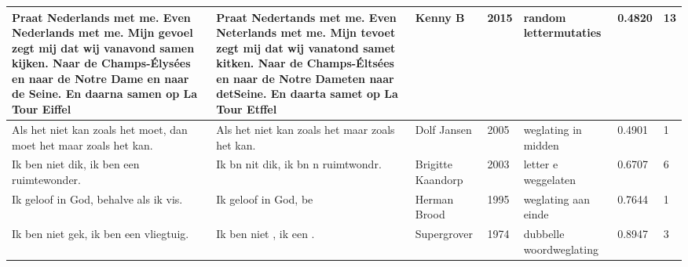 \documentclass[12pt]{article}
\begin{document}
\begin{longtable}{|p{}|p{}|p{}|p{}|p{}|p{}|p{}|}
\hline
Praat Nederlands met me. Even Nederlands met me. Mijn gevoel zegt mij dat wij vanavond samen kijken. Naar de Champs-Élysées en naar de Notre Dame en naar de Seine. En daarna samen op La Tour Eiffel & Praat Nedertands met me. Even Neterlands met me. Mijn tevoet zegt mij dat wij vanatond samet kitken. Naar de Champs-Éltsées en naar de Notre Dameten naar detSeine. En daarta samet op La Tour Etffel & Kenny B & 2015 & random lettermutaties & 0.4820 & 13 \\
\hline
Als het niet kan zoals het moet, dan moet het maar zoals het kan. & Als het niet kan zoals  het maar zoals het kan. & Dolf Jansen & 2005 &  weglating in midden & 0.4901 & 1 \\
\hline
Ik ben niet dik, ik ben een ruimtewonder. & Ik bn nit dik, ik bn n ruimtwondr. & Brigitte Kaandorp & 2003 & letter e weggelaten & 0.6707 & 6 \\
\hline
Ik geloof in God, behalve als ik vis. & Ik geloof in God, be & Herman Brood & 1995 & weglating aan einde & 0.7644 & 1 \\
\hline
Ik ben niet gek, ik ben een vliegtuig. & Ik ben niet , ik  een . & Supergrover & 1974 & dubbelle woordweglating & 0.8947 & 3 \\
\hline
\end{longtable}
\normalsize
\end{document}
